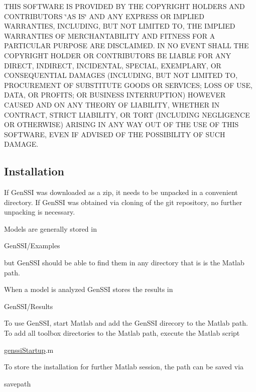 T\+H\+IS S\+O\+F\+T\+W\+A\+RE IS P\+R\+O\+V\+I\+D\+ED BY T\+HE C\+O\+P\+Y\+R\+I\+G\+HT H\+O\+L\+D\+E\+RS A\+ND C\+O\+N\+T\+R\+I\+B\+U\+T\+O\+RS \char`\"{}\+A\+S I\+S\char`\"{} A\+ND A\+NY E\+X\+P\+R\+E\+SS OR I\+M\+P\+L\+I\+ED W\+A\+R\+R\+A\+N\+T\+I\+ES, I\+N\+C\+L\+U\+D\+I\+NG, B\+UT N\+OT L\+I\+M\+I\+T\+ED TO, T\+HE I\+M\+P\+L\+I\+ED W\+A\+R\+R\+A\+N\+T\+I\+ES OF M\+E\+R\+C\+H\+A\+N\+T\+A\+B\+I\+L\+I\+TY A\+ND F\+I\+T\+N\+E\+SS F\+OR A P\+A\+R\+T\+I\+C\+U\+L\+AR P\+U\+R\+P\+O\+SE A\+RE D\+I\+S\+C\+L\+A\+I\+M\+ED. IN NO E\+V\+E\+NT S\+H\+A\+LL T\+HE C\+O\+P\+Y\+R\+I\+G\+HT H\+O\+L\+D\+ER OR C\+O\+N\+T\+R\+I\+B\+U\+T\+O\+RS BE L\+I\+A\+B\+LE F\+OR A\+NY D\+I\+R\+E\+CT, I\+N\+D\+I\+R\+E\+CT, I\+N\+C\+I\+D\+E\+N\+T\+AL, S\+P\+E\+C\+I\+AL, E\+X\+E\+M\+P\+L\+A\+RY, OR C\+O\+N\+S\+E\+Q\+U\+E\+N\+T\+I\+AL D\+A\+M\+A\+G\+ES (I\+N\+C\+L\+U\+D\+I\+NG, B\+UT N\+OT L\+I\+M\+I\+T\+ED TO, P\+R\+O\+C\+U\+R\+E\+M\+E\+NT OF S\+U\+B\+S\+T\+I\+T\+U\+TE G\+O\+O\+DS OR S\+E\+R\+V\+I\+C\+ES; L\+O\+SS OF U\+SE, D\+A\+TA, OR P\+R\+O\+F\+I\+TS; OR B\+U\+S\+I\+N\+E\+SS I\+N\+T\+E\+R\+R\+U\+P\+T\+I\+ON) H\+O\+W\+E\+V\+ER C\+A\+U\+S\+ED A\+ND ON A\+NY T\+H\+E\+O\+RY OF L\+I\+A\+B\+I\+L\+I\+TY, W\+H\+E\+T\+H\+ER IN C\+O\+N\+T\+R\+A\+CT, S\+T\+R\+I\+CT L\+I\+A\+B\+I\+L\+I\+TY, OR T\+O\+RT (I\+N\+C\+L\+U\+D\+I\+NG N\+E\+G\+L\+I\+G\+E\+N\+CE OR O\+T\+H\+E\+R\+W\+I\+SE) A\+R\+I\+S\+I\+NG IN A\+NY W\+AY O\+UT OF T\+HE U\+SE OF T\+H\+IS S\+O\+F\+T\+W\+A\+RE, E\+V\+EN IF A\+D\+V\+I\+S\+ED OF T\+HE P\+O\+S\+S\+I\+B\+I\+L\+I\+TY OF S\+U\+CH D\+A\+M\+A\+GE.\hypertarget{index_install}{}\subsection{Installation}\label{index_install}
If Gen\+S\+SI was downloaded as a zip, it needs to be unpacked in a convenient directory. If Gen\+S\+SI was obtained via cloning of the git repository, no further unpacking is necessary.

Models are generally stored in 
\begin{DoxyCode}
GenSSI/Examples 
\end{DoxyCode}
 but Gen\+S\+SI should be able to find them in any directory that is is the Matlab path.

When a model is analyzed Gen\+S\+SI stores the results in 
\begin{DoxyCode}
GenSSI/Results 
\end{DoxyCode}


To use Gen\+S\+SI, start Matlab and add the Gen\+S\+SI direcory to the Matlab path. To add all toolbox directories to the Matlab path, execute the Matlab script 
\begin{DoxyCode}
\hyperlink{genssi_startup_8m_addcff165cb4278db5bc6df9f60bff280}{genssiStartup}.m 
\end{DoxyCode}
 To store the installation for further Matlab session, the path can be saved via 
\begin{DoxyCode}
savepath 
\end{DoxyCode}
 